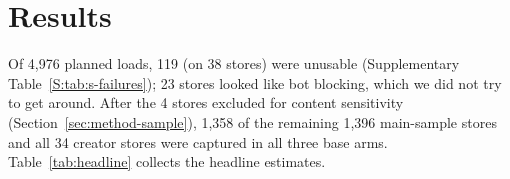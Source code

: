\section{Results}\label{sec:results}

Of 4,976 planned loads, 119 (on 38 stores) were unusable (Supplementary Table~\ref*{S:tab:s-failures}); 23 stores looked like bot blocking, which we did not try to get around. After the 4 stores excluded for content sensitivity (Section~\ref{sec:method-sample}), 1,358 of the remaining 1,396 main-sample stores and all 34 creator stores were captured in all three base arms. Table~\ref{tab:headline} collects the headline estimates.

